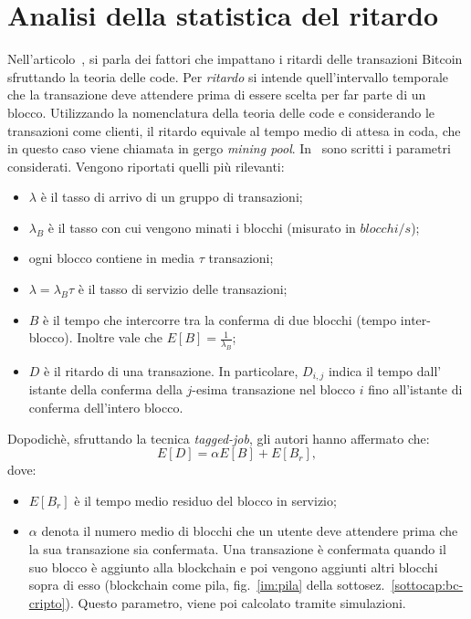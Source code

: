 \section{Analisi della statistica del ritardo}
Nell'articolo~\cite{art2:MG1}, si parla dei fattori che impattano i ritardi delle transazioni Bitcoin sfruttando la teoria delle code. Per \textit{ritardo} si intende quell'intervallo temporale che la transazione deve attendere prima di essere scelta per far parte di un blocco. Utilizzando la nomenclatura della teoria delle code e considerando le transazioni come clienti, il ritardo equivale al tempo medio di attesa in coda, che in questo caso viene chiamata in gergo \textit{mining pool}. In~\cite[sez. 4]{art2:MG1} sono scritti i parametri considerati. Vengono riportati quelli più rilevanti:
\begin{itemize}
\item $\lambda$ \`e il tasso di arrivo di un gruppo di transazioni;
\item $\lambda_B$ \`e il tasso con cui vengono minati i blocchi (misurato in $blocchi/s$);
\item ogni blocco contiene in media $\tau$ transazioni;
\item $\lambda=\lambda_B \tau$ \`e il tasso di servizio delle transazioni;
\item $B$ \`e il tempo che intercorre tra la conferma di due blocchi (tempo inter-blocco). Inoltre vale che $E[B]=\frac{1}{\lambda_B}$;
\item $D$ \`e il ritardo di una transazione. In particolare, $D_{i,j}$ indica il tempo dall’ istante della conferma della $j$-esima transazione nel blocco $i$ fino all’istante di conferma dell'intero blocco.
\end{itemize}
Dopodich\`e, sfruttando la tecnica \textit{tagged-job}, gli autori hanno affermato che:
\begin{equation}\label{eq:ritardo} E[D]=\alpha E[B] + E[B_r], \end{equation} 
dove:
\begin{itemize}
\item $E[B_r]$ \`e il tempo medio residuo del blocco in servizio;
\item $\alpha$ denota il numero medio di blocchi che un utente deve attendere prima che la sua transazione sia confermata. Una transazione \`e confermata quando il suo blocco \`e aggiunto alla blockchain e poi vengono aggiunti altri blocchi sopra di esso (blockchain come pila, fig.~\ref{im:pila} della sottosez.~\ref{sottocap:bc-cripto}). Questo parametro, viene poi calcolato tramite simulazioni.
\end{itemize}
